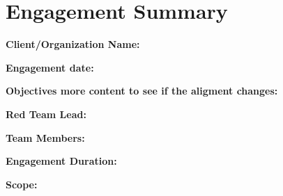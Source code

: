 \section*{Engagement Summary}

\textbf{Client/Organization Name:}

\textbf{Engagement date:}

\textbf{Objectives more content to see if the aligment changes:}

\textbf{Red Team Lead:}

\textbf{Team Members:}

\textbf{Engagement Duration:}

\textbf{Scope:}

